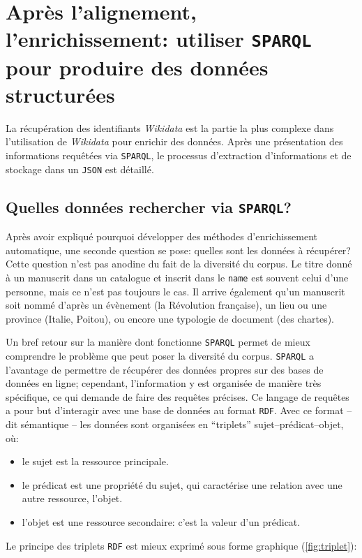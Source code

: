 \documentclass[a4paper, 12pt, twoside]{book}
\newcommand{\json}{\texttt{JSON}}
\newcommand{\rdf}{\texttt{RDF}}
\newcommand{\sparql}{\texttt{\gls{SPARQL}}}
\newcommand{\tname}{\texttt{name}}
\newcommand{\wkd}{\textit{Wikidata}}
\begin{document}
\section{Après l'alignement, l'enrichissement: utiliser \sparql{} pour produire des données structurées}
La récupération des identifiants \wkd{} est la partie la plus complexe dans l'utilisation de \wkd{} pour enrichir des données. Après une présentation des informations requêtées via \sparql{}, le processus d'extraction d'informations et de stockage dans un \json{} est détaillé.

\subsection{Quelles données rechercher via \sparql?}
Après avoir expliqué pourquoi développer des méthodes d'enrichissement automatique, une seconde question se pose: quelles sont les données à récupérer? Cette question n'est pas anodine du fait de la diversité du corpus. Le titre donné à un manuscrit dans un catalogue et inscrit dans le \tname{} est souvent celui d'une personne, mais ce n'est pas toujours le cas. Il arrive également qu'un manuscrit soit nommé d'après un évènement (la Révolution française), un lieu ou une province (Italie, Poitou), ou encore une typologie de document (des chartes).

Un bref retour sur la manière dont fonctionne \sparql{} permet de mieux comprendre le problème que peut poser la diversité du corpus. \sparql{} a l'avantage de permettre de récupérer des données propres sur des bases de données en ligne; cependant, l'information y est organisée de manière très spécifique, ce qui demande de faire des requêtes précises. Ce langage de requêtes a pour but d'interagir avec une base de données au format \rdf{}. Avec ce format -- dit sémantique -- les données sont organisées en \enquote{triplets} sujet--prédicat--objet, où:

\begin{itemize}
	\item le sujet est la ressource principale.
	\item le prédicat est une propriété du sujet, qui caractérise une relation avec une autre ressource, l'objet.
	\item l'objet est une ressource secondaire: c'est la valeur d'un prédicat.
\end{itemize}

Le principe des triplets \rdf{} est mieux exprimé sous forme graphique (\ref{fig:triplet}):
\end{document}

